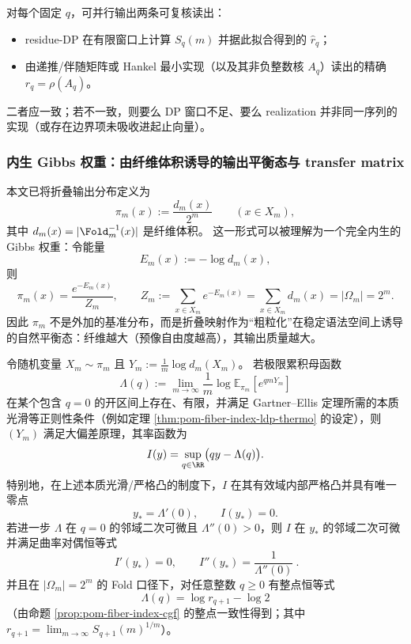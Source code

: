 \begin{remark}\label{rem:pom-dp-vs-realization-audit}
对每个固定 \(q\)，可并行输出两条可复核读出：
\begin{itemize}
  \item residue-DP 在有限窗口上计算 \(S_q(m)\) 并据此拟合得到的 \(\widehat r_q\)；
  \item 由递推/伴随矩阵或 Hankel 最小实现（以及其非负整数核 \(A_q\)）读出的精确 \(r_q=\rho(A_q)\)。
\end{itemize}
二者应一致；若不一致，则要么 DP 窗口不足、要么 realization 并非同一序列的实现（或存在边界项未吸收进起止向量）。
\end{remark}

\subsubsection{内生 Gibbs 权重：由纤维体积诱导的输出平衡态与 transfer matrix}\label{subsubsec:pom-gibbs-pi}
本文已将折叠输出分布定义为
\[
\pi_m(x):=\frac{d_m(x)}{2^m}\qquad(x\in X_m),
\]
其中 \(d_m(x)=|\Fold_m^{-1}(x)|\) 是纤维体积。
这一形式可以被理解为一个完全内生的 Gibbs 权重：令能量
\[
E_m(x):=-\log d_m(x),
\]
则
\[
\pi_m(x)=\frac{e^{-E_m(x)}}{Z_m},
\qquad
Z_m:=\sum_{x\in X_m}e^{-E_m(x)}=\sum_{x\in X_m}d_m(x)=|\Omega_m|=2^m.
\]
因此 \(\pi_m\) 不是外加的基准分布，而是折叠映射作为“粗粒化”在稳定语法空间上诱导的自然平衡态：纤维越大（预像自由度越高），其输出质量越大。
\par

\begin{proposition}\label{prop:pom-fiber-index-ldp-from-collision-spectrum}
令随机变量 \(X_m\sim\pi_m\) 且 \(Y_m:=\frac{1}{m}\log d_m(X_m)\)。
若极限累积母函数
\[
\Lambda(q):=\lim_{m\to\infty}\frac{1}{m}\log\mathbb{E}_{\pi_m}\!\left[e^{qmY_m}\right]
\]
在某个包含 \(q=0\) 的开区间上存在、有限，并满足 Gartner--Ellis 定理所需的本质光滑等正则性条件（例如定理 \ref{thm:pom-fiber-index-ldp-thermo} 的设定），则 \((Y_m)\) 满足大偏差原理，其率函数为
\[
I(y)=\sup_{q\in\RR}\bigl(qy-\Lambda(q)\bigr).
\]
特别地，在上述本质光滑/严格凸的制度下，\(I\) 在其有效域内部严格凸并具有唯一零点
\[
y_\ast=\Lambda'(0),\qquad I(y_\ast)=0.
\]
若进一步 \(\Lambda\) 在 \(q=0\) 的邻域二次可微且 \(\Lambda''(0)>0\)，则 \(I\) 在 \(y_\ast\) 的邻域二次可微并满足曲率对偶恒等式
\[
\boxed{\ I'(y_\ast)=0,\qquad I''(y_\ast)=\frac{1}{\Lambda''(0)}\ }.
\]
并且在 \(|\Omega_m|=2^m\) 的 Fold 口径下，对任意整数 \(q\ge 0\) 有整点恒等式
\[
\boxed{\ \Lambda(q)=\log r_{q+1}-\log 2\ }
\]
（由命题 \ref{prop:pom-fiber-index-cgf} 的整点一致性得到；其中 \(r_{q+1}=\lim_{m\to\infty}S_{q+1}(m)^{1/m}\)）。
\end{proposition}

